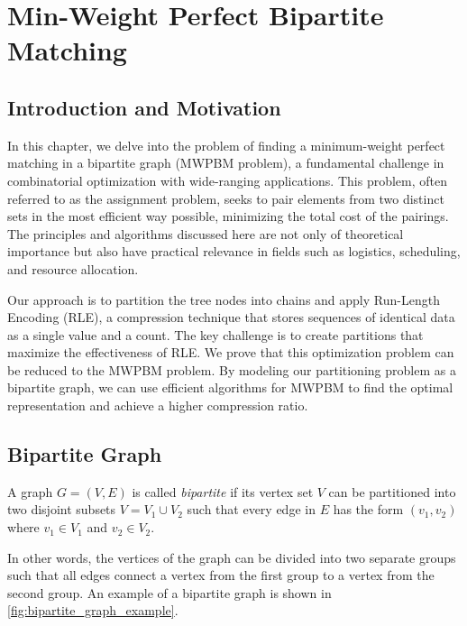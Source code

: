 \chapter{Min-Weight Perfect Bipartite Matching} \label{chp:min_weight_perfect_bipartite_matching}

\section{Introduction and Motivation}
In this chapter, we delve into the problem of finding a minimum-weight perfect matching in a bipartite graph (MWPBM problem), a fundamental challenge in combinatorial optimization with wide-ranging applications. This problem, often referred to as the assignment problem, seeks to pair elements from two distinct sets in the most efficient way possible, minimizing the total cost of the pairings. The principles and algorithms discussed here are not only of theoretical importance but also have practical relevance in fields such as logistics, scheduling, and resource allocation.

Our approach is to partition the tree nodes into chains and apply Run-Length Encoding (RLE), a compression technique that stores sequences of identical data as a single value and a count. The key challenge is to create partitions that maximize the effectiveness of RLE. We prove that this optimization problem can be reduced to the MWPBM problem. By modeling our partitioning problem as a bipartite graph, we can use efficient algorithms for MWPBM to find the optimal representation and achieve a higher compression ratio.

\section{Bipartite Graph} 
\begin{definition} \label{def:bipartite}
    A graph $G=(V,E)$ is called \textit{bipartite} if its vertex set $V$ can be partitioned into two disjoint subsets $V=V_1 \cup V_2$ such that every edge in $E$ has the form $(v_1,v_2)$ where $v_1\in V_1$ and $v_2 \in V_2$.
\end{definition} 

In other words, the vertices of the graph can be divided into two separate groups such that all edges connect a vertex from the first group to a vertex from the second group. An example of a bipartite graph is shown in \cref{fig:bipartite_graph_example}.

